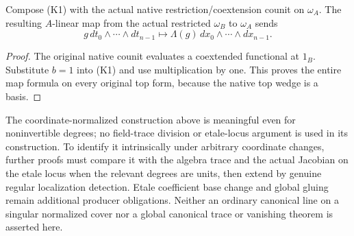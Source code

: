 \begin{corollary}
\label{cor:kn-nadel-kummer-canonical-counit}
\leanok
Compose (K1) with the actual native restriction/coextension counit
on $\omega_A$.  The resulting $A$-linear map from the actual
restricted $\omega_B$ to $\omega_A$ sends
\[
 g\,dt_0\wedge\cdots\wedge dt_{n-1}
 \longmapsto\Lambda(g)\,dx_0\wedge\cdots\wedge dx_{n-1}.
 \tag{K2}
\]
\end{corollary}
\begin{proof}
The original native counit evaluates a coextended functional at
$1_B$.  Substitute $b=1$ into (K1) and use multiplication by one.
This proves the entire map formula on every original top form,
because the native top wedge is a basis.
\end{proof}

The coordinate-normalized construction above is meaningful even
for noninvertible degrees; no field-trace division or etale-locus
argument is used in its construction.  To identify it intrinsically
under arbitrary coordinate changes, further proofs must compare
it with the algebra trace and the actual Jacobian on the etale
locus when the relevant degrees are units, then extend by genuine
regular localization detection.  Etale coefficient base change and
global gluing remain additional producer obligations.  Neither an
ordinary canonical line on a singular normalized cover nor a global
canonical trace or vanishing theorem is asserted here.
